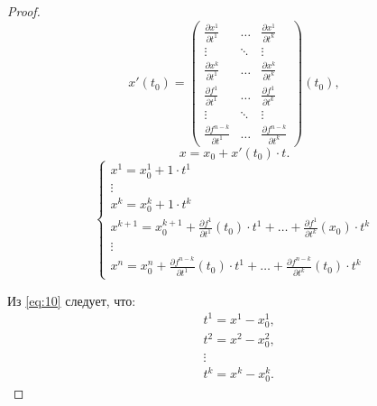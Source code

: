 \begin{proof}
    \[
        x'(t_0) = \left(\begin{matrix}
                \frac{\partial x^1}{\partial t^1}     & \ldots & \frac{\partial x^1}{\partial t^k}     \\
                \vdots                            & \ddots & \vdots                            \\
                \frac{\partial x^k}{\partial t^1}     & \ldots & \frac{\partial x^k}{\partial t^k}     \\
                \frac{\partial f^1}{\partial t^1}     & \ldots & \frac{\partial f^1}{\partial t^k}     \\
                \vdots                            & \ddots & \vdots                            \\
                \frac{\partial f^{n-k}}{\partial t^1} & \ldots & \frac{\partial f^{n-k}}{\partial t^k}
            \end{matrix}\right)(t_0),
    \]
    \[
        x = x_0 + x'(t_0)\cdot t.
    \]
    \begin{equation}\label{eq:10}
        \left\{\begin{array}{l}
            x^1 = x_0^1 + 1 \cdot t^1                                                                                                 \\
            \vdots                                                                                                                    \\
            x^k = x_0^k + 1 \cdot t^k                                                                                                 \\
            x^{k+1} = x_0^{k+1} + \frac{\partial f^1}{\partial t^1}(t_0) \cdot t^1 + \ldots + \frac{\partial f^1}{\partial t^k}(x_0)\cdot t^k \\
            \vdots                                                                                                                    \\
            x^n = x_0^n + \frac{\partial f^{n-k}}{\partial t^1}(t_0)\cdot t^1 + \ldots + \frac{\partial f^{n-k}}{\partial t^k}(t_0)\cdot t^k
        \end{array}\right.
    \end{equation}

    Из \ref{eq:10} следует, что:
    \begin{align*}
         & t^1 = x^1 - x_0^1, \\
         & t^2 = x^2 - x_0^2, \\
         & \vdots             \\
         & t^k = x^k - x_0^k.
    \end{align*}


\end{proof}
